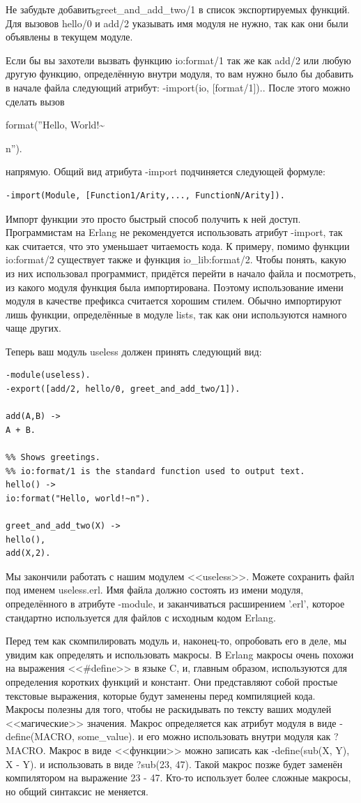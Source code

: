 \documentclass[a4paper,12pt]{report}
\newcommand{\ops}{\colorbox{lgreen}}
\begin{document}
Не забудьте добавить\ops{greet\_and\_add\_two/1} в список экспортируемых функций. Для вызовов \ops{hello/0} и \ops{add/2} указывать имя модуля не нужно, так как они были объявлены в текущем модуле.

Если бы вы захотели вызвать функцию \ops{io:format/1} так же как \ops{add/2} или любую другую функцию, определённую внутри модуля, то вам нужно было бы добавить в начале файла следующий атрибут: \ops{-import(io, [format/1]).}. После этого можно сделать вызов \ops{format(''Hello, World!\~\strut n'').} напрямую. Общий вид атрибута \ops{-import} подчиняется следующей формуле:
\begin{lstlisting}[style=erlang]
-import(Module, [Function1/Arity,..., FunctionN/Arity]).
\end{lstlisting}

Импорт функции это просто быстрый способ получить к ней доступ. Программистам на Erlang не рекомендуется использовать атрибут \ops{-import}, так как считается, что это уменьшает читаемость кода. К примеру, помимо функции \ops{io:format/2} существует также и функция \ops{io\_lib:format/2}. Чтобы понять, какую из них использовал программист, придётся перейти в начало файла и посмотреть, из какого модуля функция была импортирована. Поэтому использование имени модуля в качестве префикса считается хорошим стилем. Обычно импортируют лишь функции, определённые в модуле lists, так как они используются намного чаще других.

Теперь ваш модуль \ops{useless} должен принять следующий вид:
\begin{lstlisting}[style=erlang]
-module(useless).
-export([add/2, hello/0, greet_and_add_two/1]).
 
add(A,B) ->
A + B.
 
%% Shows greetings.
%% io:format/1 is the standard function used to output text.
hello() ->
io:format("Hello, world!~n").
 
greet_and_add_two(X) ->
hello(),
add(X,2).
\end{lstlisting}

Мы закончили работать с нашим модулем <<useless>>. Можете сохранить файл под именем \ops{useless.erl}. Имя файла должно состоять из имени модуля, определённого в атрибуте \ops{-module}, и заканчиваться расширением '.erl', которое стандартно используется для файлов с исходным кодом Erlang.

Перед тем как скомпилировать модуль и, наконец\--то, опробовать его в деле, мы увидим как определять и использовать макросы. В Erlang макросы очень похожи на выражения <<\#define>> в языке C, и, главным образом, используются для определения коротких функций и констант. Они представляют собой простые текстовые выражения, которые будут заменены перед компиляцией кода. Макросы полезны для того, чтобы не раскидывать по тексту ваших модулей <<магические>> значения. Макрос определяется как атрибут модуля в виде \ops{-define(MACRO, some\_value).} и его можно использовать внутри модуля как \ops{?MACRO}. Макрос в виде <<функции>> можно записать как \ops{-define(sub(X, Y), X - Y).} и использовать в виде \ops{?sub(23, 47)}. Такой макрос позже будет заменён компилятором на выражение \ops{23 - 47}. Кто\--то использует более сложные макросы, но общий синтаксис не меняется.
\end{document}
